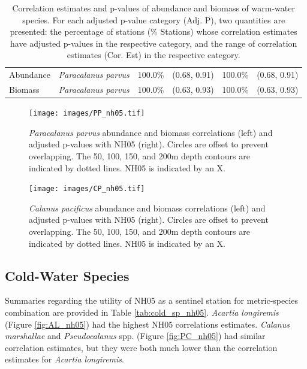 \documentclass[preprint, authoryear, 12pt]{elsarticle}
\begin{document}
\begin{table}[ht]
\begin{tabular}{llrcrc}
         Abundance & \textit{Paracalanus parvus}  & 100.0\% &  (0.68, 0.91) & 100.0\% & (0.68, 0.91) \\
         Biomass & \textit{Paracalanus parvus}  & 100.0\% &  (0.63, 0.93) & 100.0\% & (0.63, 0.93) \\
         \hline
    \end{tabular}
    \caption{Correlation estimates and p-values of abundance and biomass of warm-water species. For each adjusted p-value category (Adj. P), two quantities are presented: the percentage of stations (\% Stations) whose correlation estimates have adjusted p-values in the respective category, and the range of correlation estimates (Cor. Est) in the respective category.}
    \label{tab:warm_sp_nh05}
\end{table}



\begin{figure}[ht]
  \centering
  \texttt{[image: images/PP\_nh05.tif]}
  \caption{\textit{Paracalanus parvus} abundance and biomass correlations (left) and adjusted p-values with NH05 (right).  Circles are offset to prevent overlapping. The 50, 100, 150, and 200m depth contours are indicated by dotted lines.  NH05 is indicated by an X. }
  \label{fig:PP_nh05}
  \texttt{[image: images/CP\_nh05.tif]}
  \caption{\textit{Calanus pacificus} abundance and biomass correlations (left) and adjusted p-values with NH05 (right).  Circles are offset to prevent overlapping. The 50, 100, 150, and 200m depth contours are indicated by dotted lines.  NH05 is indicated by an X. }
  \label{fig:CP_nh05}
\end{figure}

\clearpage
\renewcommand{\thesubsection}{B.2}
\subsection{Cold-Water Species}

Summaries regarding the utility of NH05 as a sentinel station for metric-species combination are provided in Table \ref{tab:cold_sp_nh05}.  \textit{Acartia longiremis} (Figure \ref{fig:AL_nh05}) had the highest NH05 correlations estimates. \textit{Calanus marshallae} and \textit{Pseudocalanus} spp. (Figure \ref{fig:PC_nh05}) had similar correlation estimates, but they were both much lower than the correlation estimates for \textit{Acartia longiremis}.
\end{document}
